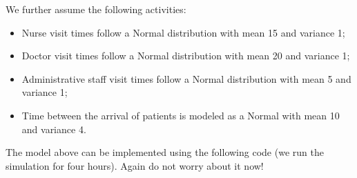 \documentclass[
]{book}
\theoremstyle{definition}
\theoremstyle{definition}
\theoremstyle{definition}
\theoremstyle{definition}
\theoremstyle{remark}
\begin{document}
We further assume the following activities:

\begin{itemize}
\item
  Nurse visit times follow a Normal distribution with mean 15 and variance 1;
\item
  Doctor visit times follow a Normal distribution with mean 20 and variance 1;
\item
  Administrative staff visit times follow a Normal distribution with mean 5 and variance 1;
\item
  Time between the arrival of patients is modeled as a Normal with mean 10 and variance 4.
\end{itemize}

The model above can be implemented using the following code (we run the simulation for four hours). Again do not worry about it now!
\end{document}
